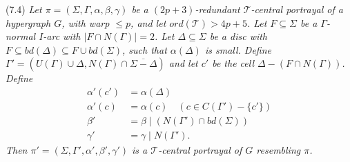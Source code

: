 \stmt
(7.4) \textit{Let $\pi = (\Sigma, \Gamma, \alpha, \beta, \gamma)$ be a $(2p+3)$-redundant $\mathcal{T}$-central portrayal of a hypergraph $G$, with warp $\le p$, and let $ord(\mathcal{T}) > 4p+5$. Let $F \subseteq \Sigma$ be a $\Gamma$-normal $I$-arc with $|F \cap N(\Gamma)| = 2$. Let $\Delta \subseteq \Sigma$ be a disc with $F \subseteq bd(\Delta) \subseteq F \cup bd(\Sigma)$, such that $\alpha(\Delta)$ is small. Define $\Gamma' = (U(\Gamma) \cup \Delta, N(\Gamma) \cap \overline{\Sigma - \Delta})$ and let $c'$ be the cell $\Delta - (F \cap N(\Gamma))$. Define}
\begin{align*}
\alpha'(c') &= \alpha(\Delta) \\
\alpha'(c) &= \alpha(c) \quad (c \in C(\Gamma') - \{c'\}) \\
\beta' &= \beta \mid (N(\Gamma') \cap bd(\Sigma)) \\
\gamma' &= \gamma \mid N(\Gamma').
\end{align*}
\textit{Then $\pi' = (\Sigma, \Gamma', \alpha', \beta', \gamma')$ is a $\mathcal{T}$-central portrayal of $G$ resembling $\pi$.}

